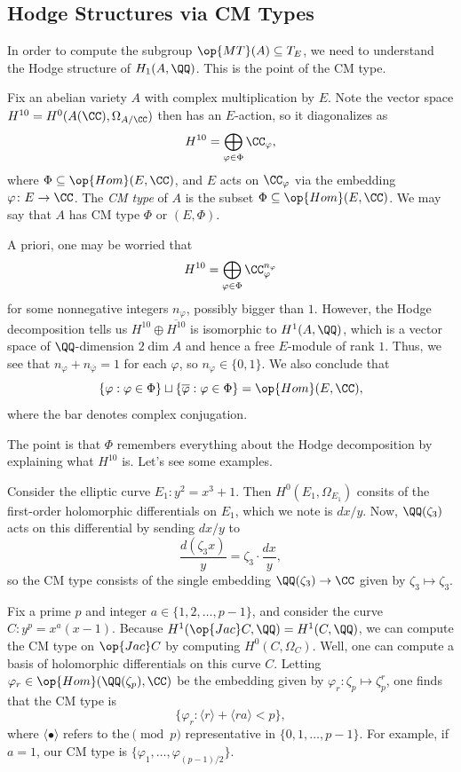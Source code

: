 \documentclass{article}
\begin{document}
\subsection{Hodge Structures via CM Types}
In order to compute the subgroup $\op{MT}(A)\subseteq T_E$, we need to understand the Hodge structure of $H_1(A,\QQ)$. This is the point of the CM type.
\begin{definition}[CM type]
	Fix an abelian variety $A$ with complex multiplication by $E$. Note the vector space $H^{10}=H^0(A(\CC),\Omega_{A/\CC})$ then has an $E$-action, so it diagonalizes as
	\[H^{10}=\bigoplus_{\varphi\in\Phi}\CC_\varphi,\]
	where $\Phi\subseteq\op{Hom}(E,\CC)$, and $E$ acts on $\CC_\varphi$ via the embedding $\varphi\colon E\to\CC$. The \textit{CM type} of $A$ is the subset $\Phi\subseteq\op{Hom}(E,\CC)$. We may say that $A$ has CM type $\Phi$ or $(E,\Phi)$.
\end{definition}
\begin{remark}
	A priori, one may be worried that
	\[H^{10}=\bigoplus_{\varphi\in\Phi}\CC_\varphi^{n_\varphi}\]
	for some nonnegative integers $n_\varphi$, possibly bigger than $1$. However, the Hodge decomposition tells us $H^{10}\oplus\overline{H^{10}}$ is isomorphic to $H^1(A,\QQ)$, which is a vector space of $\QQ$-dimension $2\dim A$ and hence a free $E$-module of rank $1$. Thus, we see that $n_\varphi+n_{\overline\varphi}=1$ for each $\varphi$, so $n_\varphi\in\{0,1\}$. We also conclude that
	\[\{\varphi:\varphi\in\Phi\}\sqcup\{\overline\varphi:\varphi\in\Phi\}=\op{Hom}(E,\CC),\]
	where the bar denotes complex conjugation.
\end{remark}
The point is that $\Phi$ remembers everything about the Hodge decomposition by explaining what $H^{10}$ is. Let's see some examples.
\begin{example}
	Consider the elliptic curve $E_1\colon y^2=x^3+1$. Then $H^0(E_1,\Omega_{E_1})$ consits of the first-order holomorphic differentials on $E_1$, which we note is $dx/y$. Now, $\QQ(\zeta_3)$ acts on this differential by sending $dx/y$ to
	\[\frac{d(\zeta_3x)}{y}=\zeta_3\cdot\frac{dx}y,\]
	so the CM type consists of the single embedding $\QQ(\zeta_3)\to\CC$ given by $\zeta_3\mapsto\zeta_3$.
\end{example}
\begin{example} \label{ex:fermat-type}
	Fix a prime $p$ and integer $a\in\{1,2,\ldots,p-1\}$, and consider the curve $C\colon y^p=x^a(x-1)$. Because $H^1(\op{Jac}C,\QQ)=H^1(C,\QQ)$, we can compute the CM type on $\op{Jac}C$ by computing $H^0(C,\Omega_C)$. Well, one can compute a basis of holomorphic differentials on this curve $C$. Letting $\varphi_r\in\op{Hom}(\QQ(\zeta_p),\CC)$ be the embedding given by $\varphi_r\colon\zeta_p\mapsto\zeta_p^r$, one finds that the CM type is
	\[\{\varphi_r:\langle r\rangle+\langle ra\rangle<p\},\]
	where $\langle\bullet\rangle$ refers to the$\pmod p$ representative in $\{0,1,\ldots,p-1\}$. For example, if $a=1$, our CM type is $\{\varphi_1,\ldots,\varphi_{(p-1)/2}\}$.
\end{example}
\end{document}
